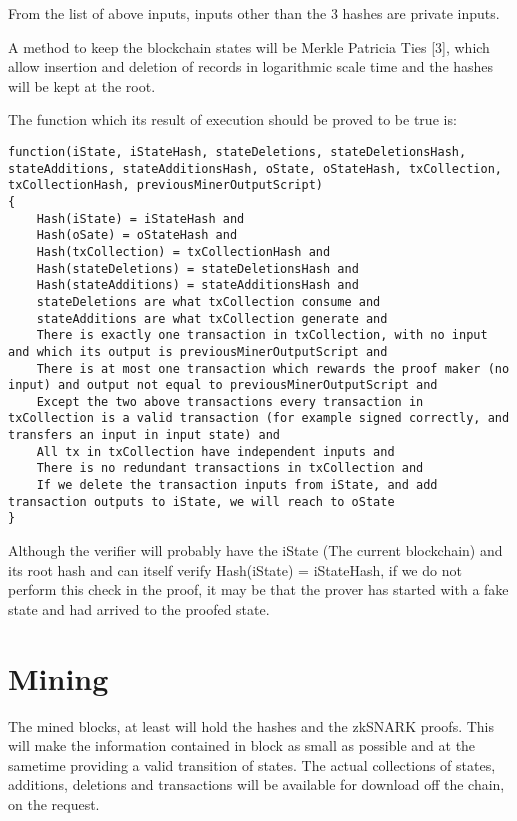 \documentclass{article}
\begin{document}
From the list of above inputs, inputs other than the 3 hashes are private inputs.

A method to keep the blockchain states will be Merkle Patricia Ties [3], which allow insertion and deletion of records in logarithmic scale time and the hashes will be kept at the root.

The function which its result of execution should be proved to be true is:

\begin{lstlisting}
function(iState, iStateHash, stateDeletions, stateDeletionsHash, stateAdditions, stateAdditionsHash, oState, oStateHash, txCollection, txCollectionHash, previousMinerOutputScript)
{
	Hash(iState) = iStateHash and
	Hash(oSate) = oStateHash and
	Hash(txCollection) = txCollectionHash and
	Hash(stateDeletions) = stateDeletionsHash and
	Hash(stateAdditions) = stateAdditionsHash and 
	stateDeletions are what txCollection consume and
	stateAdditions are what txCollection generate and
	There is exactly one transaction in txCollection, with no input and which its output is previousMinerOutputScript and 
	There is at most one transaction which rewards the proof maker (no input) and output not equal to previousMinerOutputScript and
	Except the two above transactions every transaction in txCollection is a valid transaction (for example signed correctly, and transfers an input in input state) and
	All tx in txCollection have independent inputs and
	There is no redundant transactions in txCollection and
	If we delete the transaction inputs from iState, and add transaction outputs to iState, we will reach to oState
}
\end{lstlisting}

Although the verifier will probably have the iState (The current blockchain) and its root hash and can itself verify Hash(iState) = iStateHash, if we do not perform this check in the proof, it may be that the prover has started with a fake state and had arrived to the proofed state.

\section{Mining}

The mined blocks, at least will hold the hashes and the zkSNARK proofs. This will make the information contained in block as small as possible and at the sametime providing a valid transition of states. The actual collections of states, additions, deletions and transactions will be available for download off the chain, on the request.
\end{document}
